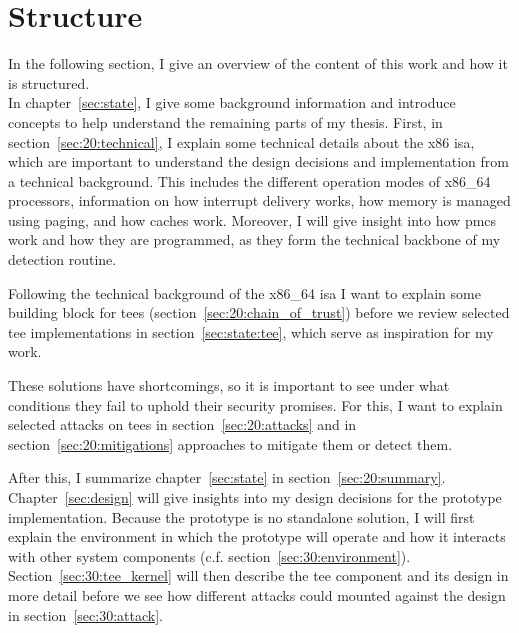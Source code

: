\section{Structure}
\label{sec:10_structure}
In the following section, I give an overview of the content of this work
and how it is structured.\\

In chapter~\ref{sec:state}, I give some background information and
introduce concepts to help understand the remaining parts of my
thesis. First, in section~\ref{sec:20:technical}, I explain some
technical details about the x86 \gls{isa}, which are important to understand the
design decisions and implementation from a technical background. This includes
the different operation modes of x86\_64 processors, information on how
interrupt delivery works, how memory is managed using paging, and how caches
work. Moreover, I will give insight into how \glspl{pmc} work and how they are
programmed, as they form the technical backbone of my detection routine.

Following the technical background of the x86\_64 \gls{isa} I want to explain
some building block for \glspl{tee} (section~\ref{sec:20:chain_of_trust}) before
we review selected \gls{tee} implementations in section~\ref{sec:state:tee},
which serve as inspiration for my work.

These solutions have shortcomings, so it is important to see under
what conditions they fail to uphold their security promises. For this, I want
to explain selected attacks on \glspl{tee} in section~\ref{sec:20:attacks} and
in section~\ref{sec:20:mitigations} approaches to mitigate them or detect them.

After this, I summarize chapter~\ref{sec:state} in
section~\ref{sec:20:summary}.\\

Chapter~\ref{sec:design} will give insights into my design decisions for
the prototype implementation. Because the prototype is no standalone solution, I
will first explain the environment in which the prototype will operate and how
it interacts with other system components (c.f.
section~\ref{sec:30:environment}). Section~\ref{sec:30:tee_kernel} will then
describe the \gls{tee} component and its design in more detail before we
see how different attacks could mounted against the design in
section~\ref{sec:30:attack}.\\

